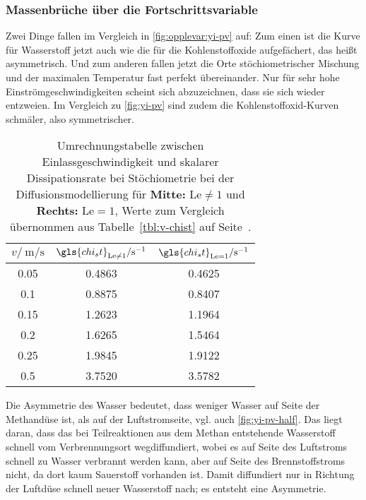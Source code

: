 \subsubsection{Massenbrüche über die Fortschrittsvariable}

Zwei Dinge fallen im Vergleich in \autoref{fig:opplevar:yi-pv} auf: Zum einen ist die Kurve für Wasserstoff jetzt auch wie die für die Kohlenstoffoxide aufgefächert, das heißt asymmetrisch. Und zum anderen fallen jetzt die Orte stöchiometrischer Mischung und der maximalen Temperatur fast perfekt übereinander. Nur für sehr hohe Einströmgeschwindigkeiten scheint sich abzuzeichnen, dass sie sich wieder entzweien. Im Vergleich zu \autoref{fig:yi-pv} sind zudem die Kohlenstoffoxid-Kurven schmäler, also symmetrischer.

\begin{table}[h]
    \begin{center}\begin{scriptsize}\begin{tabular}{|c|c|c|}
        \hline
        $v / \SI{}{\meter\per\second}$ &
        $\gls{chi_st}_{\mathrm{Le}\neq 1} / \SI{}{\per\second}$ &
        $\gls{chi_st}_{\mathrm{Le}= 1} / \SI{}{\per\second}$
        \\
        \hline
        0.05  & 0.4863 & 0.4625 \\
        0.1   & 0.8875 & 0.8407 \\
        0.15  & 1.2623 & 1.1964 \\
        0.2   & 1.6265 & 1.5464 \\
        0.25  & 1.9845 & 1.9122 \\
        0.5   & 3.7520 & 3.5782 \\
        \hline
    \end{tabular}\end{scriptsize}\end{center}
    \caption{Umrechnungstabelle zwischen Einlassgeschwindigkeit und skalarer Dissipationsrate bei Stöchiometrie bei der Diffusionsmodellierung für \textbf{Mitte:} $\mathrm{Le}\neq 1$ und \textbf{Rechts:} $\mathrm{Le}=1$, Werte zum Vergleich übernommen aus Tabelle~\ref{tbl:v-chist} auf Seite~\pageref{tbl:v-chist}.}
    \label{tbl:opplevar:v-chist}
\end{table}

Die Asymmetrie des Wasser bedeutet, dass weniger Wasser auf Seite der Methandüse ist, als auf der Luftstromseite, vgl. auch \autoref{fig:yi-pv-half}. Das liegt daran, dass das bei Teilreaktionen aus dem Methan entstehende Wasserstoff schnell vom Verbrennungsort wegdiffundiert, wobei es auf Seite des Luftstroms schnell zu Wasser verbrannt werden kann, aber auf Seite des Brennstoffstroms nicht, da dort kaum Sauerstoff vorhanden ist. Damit diffundiert nur in Richtung der Luftdüse schnell neuer Wasserstoff nach; es entsteht eine Asymmetrie.

